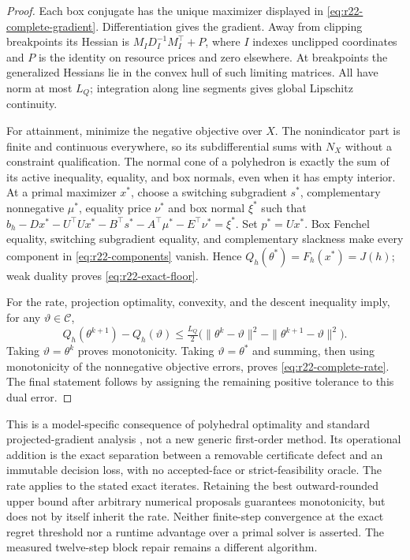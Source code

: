 \begin{proof}
Each box conjugate has the unique maximizer displayed in \eqref{eq:r22-complete-gradient}. Differentiation gives the gradient. Away from clipping breakpoints its Hessian is $M_I D_I^{-1}M_I^\top+P$, where $I$ indexes unclipped coordinates and $P$ is the identity on resource prices and zero elsewhere. At breakpoints the generalized Hessians lie in the convex hull of such limiting matrices. All have norm at most $L_Q$; integration along line segments gives global Lipschitz continuity.

For attainment, minimize the negative objective over $X$. The nonindicator part is finite and continuous everywhere, so its subdifferential sums with $N_X$ without a constraint qualification. The normal cone of a polyhedron is exactly the sum of its active inequality, equality, and box normals, even when it has empty interior. At a primal maximizer $x^*$, choose a switching subgradient $s^*$, complementary nonnegative $\mu^*$, equality price $\nu^*$ and box normal $\xi^*$ such that
$b_h-Dx^*-U^\top Ux^*-B^\top s^*-A^\top\mu^*-E^\top\nu^*=\xi^*$.
Set $p^*=Ux^*$. Box Fenchel equality, switching subgradient equality, and complementary slackness make every component in \eqref{eq:r22-components} vanish. Hence $Q_h(\theta^*)=F_h(x^*)=J(h)$; weak duality proves \eqref{eq:r22-exact-floor}.

For the rate, projection optimality, convexity, and the descent inequality imply, for any $\vartheta\in\mathcal C$,
\[
 Q_h(\theta^{k+1})-Q_h(\vartheta)
 \leq \tfrac{L_Q}{2}\big(\|\theta^k-\vartheta\|^2-\|\theta^{k+1}-\vartheta\|^2\big).
\]
Taking $\vartheta=\theta^k$ proves monotonicity. Taking $\vartheta=\theta^*$ and summing, then using monotonicity of the nonnegative objective errors, proves \eqref{eq:r22-complete-rate}. The final statement follows by assigning the remaining positive tolerance to this dual error.
\end{proof}
This is a model-specific consequence of polyhedral optimality and standard projected-gradient analysis \citep{BoydVandenberghe2004,BeckTeboulle2009}, not a new generic first-order method. Its operational addition is the exact separation between a removable certificate defect and an immutable decision loss, with no accepted-face or strict-feasibility oracle. The rate applies to the stated exact iterates. Retaining the best outward-rounded upper bound after arbitrary numerical proposals guarantees monotonicity, but does not by itself inherit the rate. Neither finite-step convergence at the exact regret threshold nor a runtime advantage over a primal solver is asserted. The measured twelve-step block repair remains a different algorithm.

